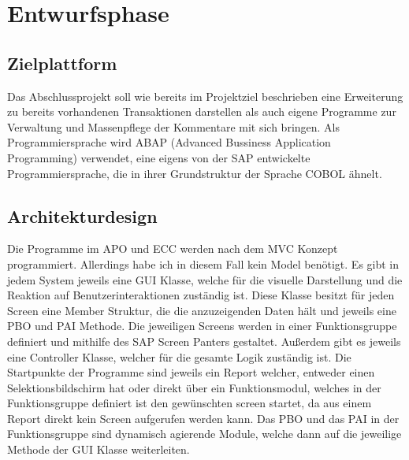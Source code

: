 \section{Entwurfsphase} 
\label{sec:Entwurfsphase}

\subsection{Zielplattform}
\label{sec:Zielplattform}
Das Abschlussprojekt soll wie bereits im Projektziel beschrieben eine Erweiterung zu bereits vorhandenen Transaktionen darstellen als auch eigene Programme zur Verwaltung und Massenpflege der Kommentare mit sich bringen. Als Programmiersprache wird ABAP (Advanced Bussiness Application Programming) verwendet, eine eigens von der SAP entwickelte Programmiersprache, die in ihrer Grundstruktur der Sprache COBOL ähnelt.

\subsection{Architekturdesign}
\label{sec:Architekturdesign}
Die Programme im \ac*{APO} und \ac*{ECC} werden nach dem \ac*{MVC} Konzept programmiert. Allerdings habe ich in diesem Fall kein Model benötigt. Es gibt in jedem System jeweils eine \ac*{GUI} Klasse, welche für die visuelle Darstellung und die Reaktion auf Benutzerinteraktionen zuständig ist. Diese Klasse besitzt für jeden Screen eine Member Struktur, die die anzuzeigenden Daten hält und jeweils eine \ac*{PBO} und \ac*{PAI} Methode. Die jeweiligen Screens werden in einer Funktionsgruppe definiert und mithilfe des SAP Screen Panters gestaltet. Außerdem gibt es jeweils eine Controller Klasse, welcher für die gesamte Logik zuständig ist. Die Startpunkte der Programme sind jeweils ein Report welcher, entweder einen Selektionsbildschirm hat oder direkt über ein Funktionsmodul, welches in der Funktionsgruppe definiert ist den gewünschten screen startet, da aus einem Report direkt kein Screen aufgerufen werden kann. Das \ac*{PBO} und das \ac*{PAI} in der Funktionsgruppe sind dynamisch agierende Module, welche dann auf die jeweilige Methode der \ac*{GUI} Klasse weiterleiten.

